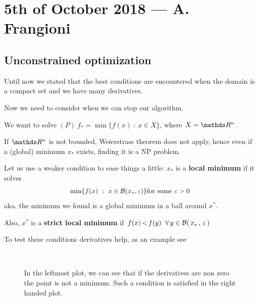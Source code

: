 \documentclass[computationalMathematics.tex]{subfiles}
\begin{document}
\section{5th of October 2018 --- A. Frangioni}
\subsection{Unconstrained optimization}

Until now we stated that the best conditions are encountered when the domain is a compact set and we have many derivatives.

Now we need to consider when we can stop our algorithm.

\begin{definition}
We want to solve $(P)~f_* = \min \{f(x)~:~x \in X\}$, where $X = \R^n$.
\end{definition}

If $\R^n$ is not bounded, Weierstrass theorem does not apply, hence even if a (global) minimum $x_*$ exists, finding it is a NP problem.

Let us use a weaker condition to ease things a little: $x_*$ is a \textbf{local minimum} if it solves
\[
  \min \{f(x)~:~x \in \mathcal{B}(x_*, \varepsilon) \}\mbox{for some } \varepsilon > 0
\]
aka, the minimum we found is a global minimum in a ball around $x^*$.

Also, $x^*$ is a \textbf{strict local minimum} if $f(x) \,  {<} \, f(y) \;\; \forall \, y \in \mathcal{B}( \, x_* \,,\, \varepsilon \, )$

To test these conditions derivatives help, as an example see 


\begin{figure}[h]
  \centering
  \hspace{0.5cm}
  \\
  \caption{In the leftmost plot, we can see that if the derivatives are non zero the point is not a minimum. Such a condition is satisfied in the right handed plot.}\label{fig:5ott_1}
\end{figure}
\end{document}
